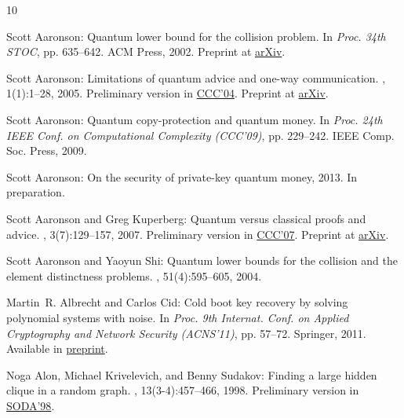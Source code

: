 \tocrefpdfbookmark
\begin{thebibliography}{10}

{\sc Scott Aaronson}: Quantum lower bound for the collision problem.
\newblock In {\em Proc. 34th STOC}, pp. 635--642. ACM Press, 2002.
\newblock Preprint at \href{http://arxiv.org/abs/quant-ph/0111102}{arXiv}.
\newblock [\epfmtdoi{10.1145/509907.509999}]

{\sc Scott Aaronson}: Limitations of quantum advice and one-way communication.
, 1(1):1--28, 2005.
\newblock Preliminary version in
  \href{http://dx.doi.org/10.1109/CCC.2004.1313854}{CCC'04}. Preprint at
  \href{http://arxiv.org/abs/quant-ph/0402095}{arXiv}.

{\sc Scott Aaronson}: Quantum copy-protection and quantum money.
\newblock In {\em Proc. 24th IEEE Conf. on Computational Complexity (CCC'09)},
  pp. 229--242. IEEE Comp. Soc. Press, 2009.

{\sc Scott Aaronson}: On the security of private-key quantum money, 2013.
\newblock In preparation.

{\sc Scott Aaronson and Greg Kuperberg}: Quantum versus classical proofs and
  advice.
, 3(7):129--157, 2007.
\newblock Preliminary version in
  \href{http://dx.doi.org/10.1109/CCC.2007.27}{CCC'07}. Preprint at
  \href{http://arxiv.org/abs/quant-ph/0604056}{arXiv}.

{\sc Scott Aaronson and Yaoyun Shi}: Quantum lower bounds for the collision and
  the element distinctness problems.
, 51(4):595--605, 2004.
\newblock [\epfmtdoi{10.1145/1008731.1008735}]

{\sc Martin~R. Albrecht and Carlos Cid}: Cold boot key recovery by solving
  polynomial systems with noise.
\newblock In {\em Proc. 9th Internat. Conf. on Applied Cryptography and Network
  Security (ACNS'11)}, pp. 57--72. Springer, 2011.
\newblock Available in \href{http://eprint.iacr.org/2011/038}{preprint}.
\newblock [\epfmtdoi{10.1007/978-3-642-21554-4\_4}]

{\sc Noga Alon, Michael Krivelevich, and Benny Sudakov}: Finding a large hidden
  clique in a random graph.
, 13(3-4):457--466, 1998.
\newblock Preliminary version in
  \href{http://dl.acm.org/citation.cfm?id=314613.315014}{SODA'98}.


\end{thebibliography}
